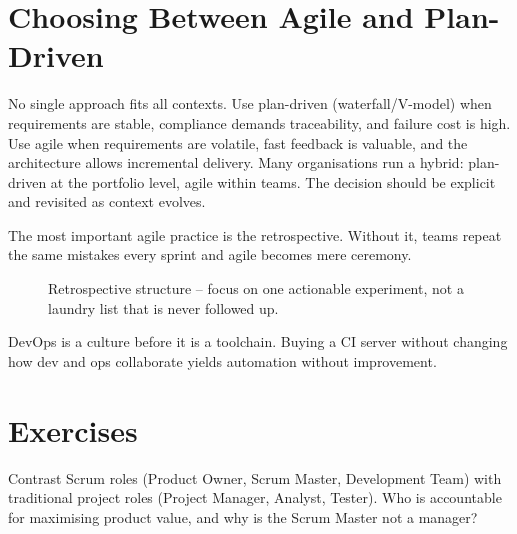 \section{Choosing Between Agile and Plan-Driven}

No single approach fits all contexts. Use plan-driven (waterfall/V-model) when requirements are stable, compliance demands traceability, and failure cost is high. Use agile when requirements are volatile, fast feedback is valuable, and the architecture allows incremental delivery. Many organisations run a hybrid: plan-driven at the portfolio level, agile within teams. The decision should be explicit and revisited as context evolves.

\begin{remark}
The most important agile practice is the retrospective. Without it, teams repeat the same mistakes every sprint and agile becomes mere ceremony.
\end{remark}

\begin{figure}[h]
\centering
{}
\caption{Retrospective structure -- focus on one actionable experiment, not a laundry list that is never followed up.}
\end{figure}

\begin{remark}
DevOps is a culture before it is a toolchain. Buying a CI server without changing how dev and ops collaborate yields automation without improvement.
\end{remark}

\section{Exercises}

\begin{exercise}
Contrast Scrum roles (Product Owner, Scrum Master, Development Team) with traditional project roles (Project Manager, Analyst, Tester). Who is accountable for maximising product value, and why is the Scrum Master not a manager?
\end{exercise}

